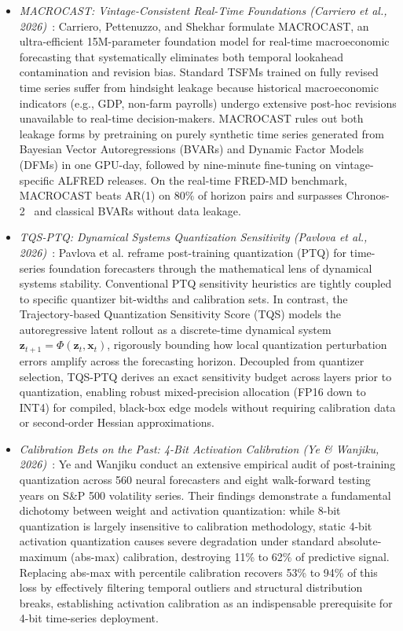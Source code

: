 \begin{itemize}[leftmargin=*]
    \item \emph{MACROCAST: Vintage-Consistent Real-Time Foundations (Carriero et al., 2026)}~\cite{carriero2026macrocast}: Carriero, Pettenuzzo, and Shekhar formulate MACROCAST, an ultra-efficient 15M-parameter foundation model for real-time macroeconomic forecasting that systematically eliminates both temporal lookahead contamination and revision bias. Standard TSFMs trained on fully revised time series suffer from hindsight leakage because historical macroeconomic indicators (e.g., GDP, non-farm payrolls) undergo extensive post-hoc revisions unavailable to real-time decision-makers. MACROCAST rules out both leakage forms by pretraining on purely synthetic time series generated from Bayesian Vector Autoregressions (BVARs) and Dynamic Factor Models (DFMs) in one GPU-day, followed by nine-minute fine-tuning on vintage-specific ALFRED releases. On the real-time FRED-MD benchmark, MACROCAST beats AR(1) on $80\%$ of horizon pairs and surpasses Chronos-2~\cite{ansari2025chronos2} and classical BVARs without data leakage.
    \item \emph{TQS-PTQ: Dynamical Systems Quantization Sensitivity (Pavlova et al., 2026)}~\cite{pavlova2026tqs}: Pavlova et al. reframe post-training quantization (PTQ) for time-series foundation forecasters through the mathematical lens of dynamical systems stability. Conventional PTQ sensitivity heuristics are tightly coupled to specific quantizer bit-widths and calibration sets. In contrast, the Trajectory-based Quantization Sensitivity Score (TQS) models the autoregressive latent rollout as a discrete-time dynamical system $\mathbf{z}_{t+1} = \Phi(\mathbf{z}_t, \mathbf{x}_t)$, rigorously bounding how local quantization perturbation errors amplify across the forecasting horizon. Decoupled from quantizer selection, TQS-PTQ derives an exact sensitivity budget across layers prior to quantization, enabling robust mixed-precision allocation (FP16 down to INT4) for compiled, black-box edge models without requiring calibration data or second-order Hessian approximations.
    \item \emph{Calibration Bets on the Past: 4-Bit Activation Calibration (Ye \& Wanjiku, 2026)}~\cite{ye2026calibration}: Ye and Wanjiku conduct an extensive empirical audit of post-training quantization across 560 neural forecasters and eight walk-forward testing years on S\&P 500 volatility series. Their findings demonstrate a fundamental dichotomy between weight and activation quantization: while 8-bit quantization is largely insensitive to calibration methodology, static 4-bit activation quantization causes severe degradation under standard absolute-maximum (abs-max) calibration, destroying 11\% to 62\% of predictive signal. Replacing abs-max with percentile calibration recovers 53\% to 94\% of this loss by effectively filtering temporal outliers and structural distribution breaks, establishing activation calibration as an indispensable prerequisite for 4-bit time-series deployment.

\end{itemize}
